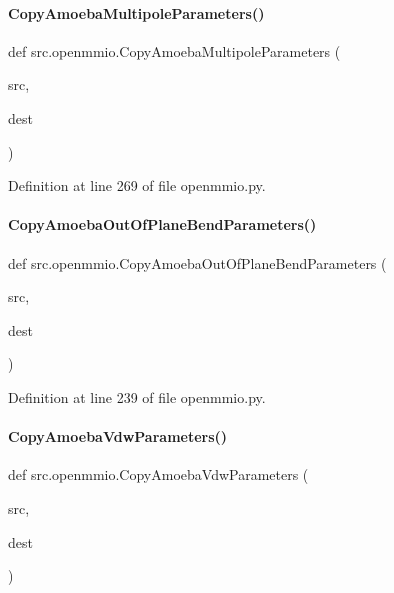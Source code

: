 \paragraph{\texorpdfstring{Copy\+Amoeba\+Multipole\+Parameters()}{CopyAmoebaMultipoleParameters()}}
{\footnotesize\ttfamily def src.\+openmmio.\+Copy\+Amoeba\+Multipole\+Parameters (\begin{DoxyParamCaption}\item[{}]{src,  }\item[{}]{dest }\end{DoxyParamCaption})}



Definition at line 269 of file openmmio.\+py.

\mbox{\label{namespacesrc_1_1openmmio_a72f8a12fe66bfcf92c034363652249d7}} 
\paragraph{\texorpdfstring{Copy\+Amoeba\+Out\+Of\+Plane\+Bend\+Parameters()}{CopyAmoebaOutOfPlaneBendParameters()}}
{\footnotesize\ttfamily def src.\+openmmio.\+Copy\+Amoeba\+Out\+Of\+Plane\+Bend\+Parameters (\begin{DoxyParamCaption}\item[{}]{src,  }\item[{}]{dest }\end{DoxyParamCaption})}



Definition at line 239 of file openmmio.\+py.

\mbox{\label{namespacesrc_1_1openmmio_a1c3b100c558ec5e2dfc6b9e576c3e116}} 
\paragraph{\texorpdfstring{Copy\+Amoeba\+Vdw\+Parameters()}{CopyAmoebaVdwParameters()}}
{\footnotesize\ttfamily def src.\+openmmio.\+Copy\+Amoeba\+Vdw\+Parameters (\begin{DoxyParamCaption}\item[{}]{src,  }\item[{}]{dest }\end{DoxyParamCaption})}



